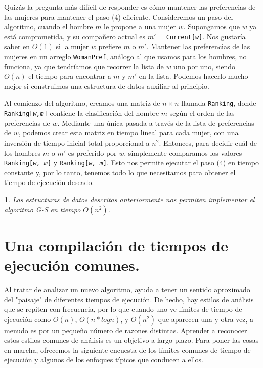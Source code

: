 \documentclass[a4paper, 12pt]{book}
\theoremstyle{dotless}
\newtheorem{theorem}{}%
\begin{document}
Quizás la pregunta más difícil de responder es cómo mantener las preferencias de las mujeres para mantener el paso (4) eficiente. Consideremos un paso del algoritmo, cuando el hombre $m$ le propone a una mujer $w$. Supongamos que $w$ ya está comprometida, y su compañero actual es $m'$ = \texttt{Current[\textit{w}]}. Nos gustaría saber en $O(1)$ si la mujer $w$ prefiere $m$ o $m'$. Mantener las preferencias de las mujeres en un arreglo \texttt{WomanPref}, análogo al que usamos para los hombres, no funciona, ya que tendríamos que recorrer la lista de $w$ uno por uno, siendo $O(n)$ el tiempo para encontrar a $m$ y $m'$ en la lista. Podemos hacerlo mucho mejor si construimos una estructura de datos auxiliar al principio.

Al comienzo del algoritmo, creamos una matriz de $n \times n$ llamada \texttt{Ranking}, donde \texttt{Ranking[\textit{w,m}]} contiene la clasificación del hombre $m$ según el orden de las preferencias de $w$. Mediante una única pasada a través de la lista de preferencias de $w$, podemos crear esta matriz en tiempo lineal para cada mujer, con una inversión de tiempo inicial total proporcional a $n^2$. Entonces, para decidir cuál de los hombres $m$ o $m'$ es preferido por $w$, simplemente comparamos los valores \texttt{Ranking[\textit{w, m}]} y \texttt{Ranking[\textit{w, m}]}. Esto nos permite ejecutar el paso (4) en tiempo constante y, por lo tanto, tenemos todo lo que necesitamos para obtener el tiempo de ejecución deseado.

\noindent\colorbox{mygray}{\parbox{\textwidth}{
\begin{theorem}
Las estructuras de datos descritas anteriormente nos permiten implementar el algoritmo G-S en tiempo $O(n^2)$.
\end{theorem}
}}



\section{Una compilación de tiempos de ejecución comunes.}

Al tratar de analizar un nuevo algoritmo, ayuda a tener un sentido aproximado del "paisaje" de diferentes tiempos de ejecución. De hecho, hay estilos de análisis que se repiten con frecuencia, por lo que cuando uno ve límites de tiempo de ejecución como $O(n)$, $O(n*log n)$, y $O(n^2)$ que aparecen una y otra vez, a menudo es por un pequeño número de razones distintas. Aprender a reconocer estos estilos comunes de análisis es un objetivo a largo plazo. Para poner las cosas en marcha, ofrecemos la siguiente encuesta de los límites comunes de tiempo de ejecución y algunos de los enfoques típicos que conducen a ellos.\\
\end{document}

